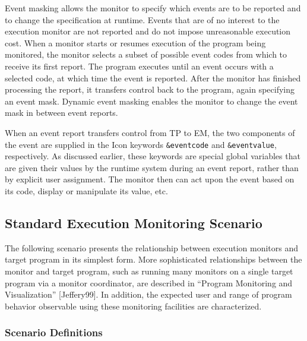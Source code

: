\begin{list}{}{\itemsep 7pt}
	Event masking allows the monitor to specify which
	events are to be reported and to change the specification at runtime.
	Events that are of no interest to the execution
	monitor are not reported and do not impose unreasonable
	execution cost.
	When a monitor starts or resumes execution of the program being
	monitored, the monitor selects
	a subset of possible event codes from which to receive its first
	report.  The program executes until an event occurs with a selected
	code, at which time the event is reported.  After the monitor has
	finished processing the report, it transfers control back to the
	program, again specifying an event mask.  Dynamic event masking
	enables the monitor to change the event mask in between event reports.


	When an event report transfers control from TP to EM, the two
	components of the event are supplied in the Icon keywords
	{\tt \&eventcode} and {\tt \&eventvalue}, respectively.
	As discussed earlier, these
	keywords are special global variables that are given their values by
	the runtime system during an event report, rather than by explicit user
	assignment.  The monitor then can act upon the event
	based on its code, display or manipulate its value, etc.
\end{list}


\subsection{Standard Execution Monitoring Scenario}

The following scenario presents the relationship between execution monitors
and target program in its simplest form.  More sophisticated relationships
between the monitor and target program, such as running many monitors on a
single target program via a monitor coordinator, are described in ``Program
Monitoring and Visualization'' [Jeffery99].  In addition, the expected user
and range of program behavior observable using these monitoring facilities
are characterized.

\subsubsection*{Scenario Definitions}

